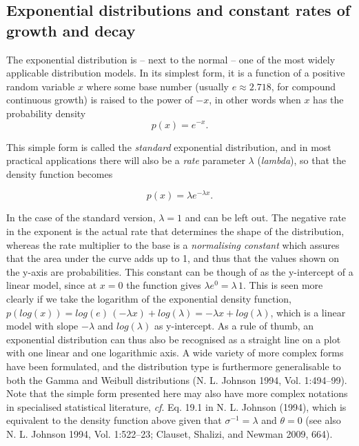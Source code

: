 \documentclass[
  12pt,
  a4paper, twoside]{book}
\begin{document}
\hypertarget{exponential-distributions-and-constant-rates-of-growth-and-decay}{%
\subsection{Exponential distributions and constant rates of growth and decay}\label{exponential-distributions-and-constant-rates-of-growth-and-decay}}

The exponential distribution is -- next to the normal -- one of the most widely applicable distribution models. In its simplest form, it is a function of a positive random variable \(x\) where some base number (usually \(e \approx 2.718\), for compound continuous growth) is raised to the power of \(-x\), in other words when \(x\) has the probability density \[p(x) = e^{-x}.\]

This simple form is called the \emph{standard} exponential distribution, and in most practical applications there will also be a \emph{rate} parameter \(\lambda\) (\emph{lambda}), so that the density function becomes

\begin{equation} p(x) = \lambda e^{-\lambda x}.
\label{eq:exponential}
\end{equation}

In the case of the standard version, \(\lambda = 1\) and can be left out. The negative rate in the exponent is the actual rate that determines the shape of the distribution, whereas the rate multiplier to the base is a \emph{normalising constant} which assures that the area under the curve adds up to 1, and thus that the values shown on the y-axis are probabilities. This constant can be though of as the y-intercept of a linear model, since at \(x = 0\) the function gives \(\lambda e^0 = \lambda\,1\). This is seen more clearly if we take the logarithm of the exponential density function, \(p(log(x)) = log(e)\,(-\lambda x) + log(\lambda) = -\lambda x+log(\lambda)\), which is a linear model with slope \(-\lambda\) and \(log(\lambda)\) as y-intercept. As a rule of thumb, an exponential distribution can thus also be recognised as a straight line on a plot with one linear and one logarithmic axis. A wide variety of more complex forms have been formulated, and the distribution type is furthermore generalisable to both the Gamma and Weibull distributions (N. L. Johnson 1994, Vol. 1:494--99). Note that the simple form presented here may also have more complex notations in specialised statistical literature, \emph{cf}. Eq. 19.1 in N. L. Johnson (1994), which is equivalent to the density function above given that \(\sigma^{-1} = \lambda\) and \(\theta = 0\) (see also N. L. Johnson 1994, Vol. 1:522--23; Clauset, Shalizi, and Newman 2009, 664).
\end{document}
